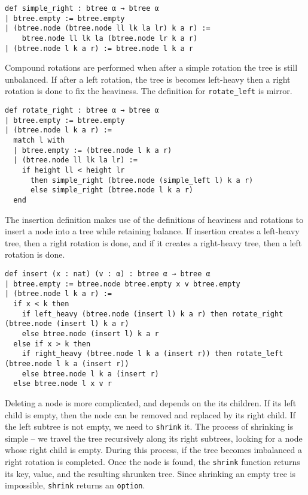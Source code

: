 \begin{lstlisting}
def simple_right : btree α → btree α
| btree.empty := btree.empty
| (btree.node (btree.node ll lk la lr) k a r) := 
    btree.node ll lk la (btree.node lr k a r)
| (btree.node l k a r) := btree.node l k a r
\end{lstlisting}

Compound rotations are performed when after a simple rotation the tree is still unbalanced. If after a left rotation, the tree is becomes left-heavy then a right rotation is done to fix the heaviness. The definition for \lstinline{rotate_left} is mirror. 

\begin{lstlisting}
def rotate_right : btree α → btree α
| btree.empty := btree.empty
| (btree.node l k a r) :=
  match l with
  | btree.empty := (btree.node l k a r)
  | (btree.node ll lk la lr) :=
    if height ll < height lr 
      then simple_right (btree.node (simple_left l) k a r)
      else simple_right (btree.node l k a r)
  end 
\end{lstlisting}

The insertion definition makes use of the definitions of heaviness and rotations to insert a node into a tree while retaining balance. If insertion creates a left-heavy tree, then a right rotation is done, and if it creates a right-heavy tree, then a left rotation is done.

\begin{lstlisting}
def insert (x : nat) (v : α) : btree α → btree α
| btree.empty := btree.node btree.empty x v btree.empty
| (btree.node l k a r) :=
  if x < k then 
    if left_heavy (btree.node (insert l) k a r) then rotate_right (btree.node (insert l) k a r)
    else btree.node (insert l) k a r
  else if x > k then
    if right_heavy (btree.node l k a (insert r)) then rotate_left (btree.node l k a (insert r))
    else btree.node l k a (insert r)
  else btree.node l x v r
\end{lstlisting}  

Deleting a node is more complicated, and depends on the its children. If its left child is empty, then the node can be removed and replaced by its right child. If the left subtree is not empty, we need to \lstinline{shrink} it. The process of shrinking is simple -- we travel the tree recursively along its right subtrees, looking for a node whose right child is empty. During this process, if the tree becomes imbalanced a right rotation is completed. Once the node is found, the \lstinline{shrink} function returns its key, value, and the resulting shrunken tree. Since shrinking an empty tree is impossible, \lstinline{shrink} returns an \lstinline{option}.

